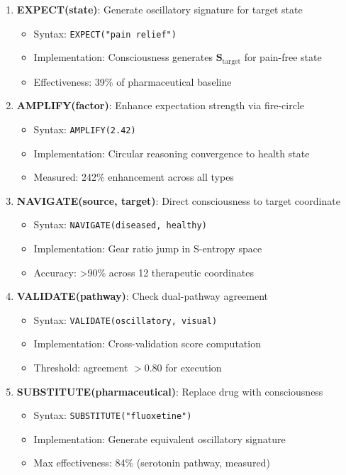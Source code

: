 \documentclass[11pt,a4paper]{article}
\begin{document}
\begin{enumerate}
\item \textbf{EXPECT(state)}: Generate oscillatory signature for target state
\begin{itemize}
\item Syntax: \texttt{EXPECT("pain relief")}
\item Implementation: Consciousness generates $\mathbf{S}_{\text{target}}$ for pain-free state
\item Effectiveness: 39\% of pharmaceutical baseline
\end{itemize}

\item \textbf{AMPLIFY(factor)}: Enhance expectation strength via fire-circle
\begin{itemize}
\item Syntax: \texttt{AMPLIFY(2.42)}
\item Implementation: Circular reasoning convergence to health state
\item Measured: 242\% enhancement across all types
\end{itemize}

\item \textbf{NAVIGATE(source, target)}: Direct consciousness to target coordinate
\begin{itemize}
\item Syntax: \texttt{NAVIGATE(diseased, healthy)}
\item Implementation: Gear ratio jump in S-entropy space
\item Accuracy: >90\% across 12 therapeutic coordinates
\end{itemize}

\item \textbf{VALIDATE(pathway)}: Check dual-pathway agreement
\begin{itemize}
\item Syntax: \texttt{VALIDATE(oscillatory, visual)}
\item Implementation: Cross-validation score computation
\item Threshold: agreement $>0.80$ for execution
\end{itemize}

\item \textbf{SUBSTITUTE(pharmaceutical)}: Replace drug with consciousness
\begin{itemize}
\item Syntax: \texttt{SUBSTITUTE("fluoxetine")}
\item Implementation: Generate equivalent oscillatory signature
\item Max effectiveness: 84\% (serotonin pathway, measured)
\end{itemize}
\end{enumerate}
\end{document}
